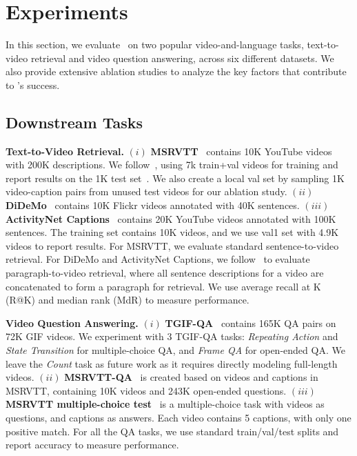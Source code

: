 \section{Experiments}\label{sec:experiments}
In this section, we evaluate \ModelName~on two popular video-and-language tasks, text-to-video retrieval and video question answering, across six different datasets.
We also provide extensive ablation studies to analyze the key factors that contribute to \ModelName's success.


\subsection{Downstream Tasks}
\noindent\textbf{Text-to-Video Retrieval.} 
$(i)$ \textbf{MSRVTT}~\cite{xu2016msr} contains 10K YouTube videos with 200K descriptions. 
We follow~\cite{yu2018joint,miech2019howto100m}, using 7k train+val videos for training and report results on the 1K test set~\cite{yu2018joint}. 
We also create a local val set by sampling 1K video-caption pairs from unused test videos for our ablation study.
$(ii)$ \textbf{DiDeMo}~\cite{anne2017localizing} contains 10K Flickr videos annotated with 40K sentences.
$(iii)$ \textbf{ActivityNet Captions}~\cite{krishna2017dense} contains 20K YouTube videos annotated with 100K sentences.
The training set contains 10K videos, and we use val1 set with 4.9K videos to report results. 
For MSRVTT, we evaluate standard sentence-to-video retrieval. For DiDeMo and ActivityNet Captions, we follow~\cite{zhang2018cross, liu2019use} to evaluate paragraph-to-video retrieval, where all sentence descriptions for a video are concatenated to form a paragraph for retrieval. We use average recall at K (R@K) and median rank (MdR) to measure performance.


\noindent\textbf{Video Question Answering.} 
$(i)$ \textbf{TGIF-QA}~\cite{jang2017tgif} contains 165K QA pairs on 72K GIF videos. 
We experiment with 3 TGIF-QA tasks: \textit{Repeating Action} and \textit{State Transition} for multiple-choice QA, and \textit{Frame QA} for open-ended QA. 
We leave the \textit{Count} task as future work as it requires directly modeling full-length videos.
$(ii)$ \textbf{MSRVTT-QA}~\cite{xu2017video} is created based on videos and captions in MSRVTT, containing 10K videos and 243K open-ended questions. 
$(iii)$ \textbf{MSRVTT multiple-choice test}~\cite{yu2018joint} is a multiple-choice task with videos as questions, and captions as answers.
Each video contains 5 captions, with only one positive match.
For all the QA tasks, we use standard train/val/test splits and report accuracy to measure performance.




